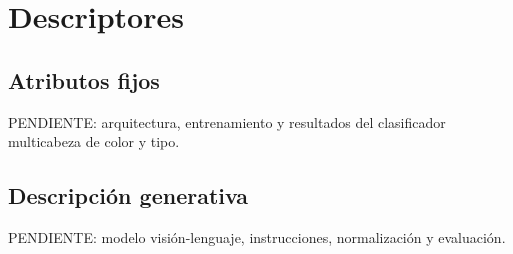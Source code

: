 \section{Descriptores}

\subsection{Atributos fijos}
PENDIENTE: arquitectura, entrenamiento y resultados del clasificador
multicabeza de color y tipo.

\subsection{Descripción generativa}
PENDIENTE: modelo visión-lenguaje, instrucciones, normalización y evaluación.
